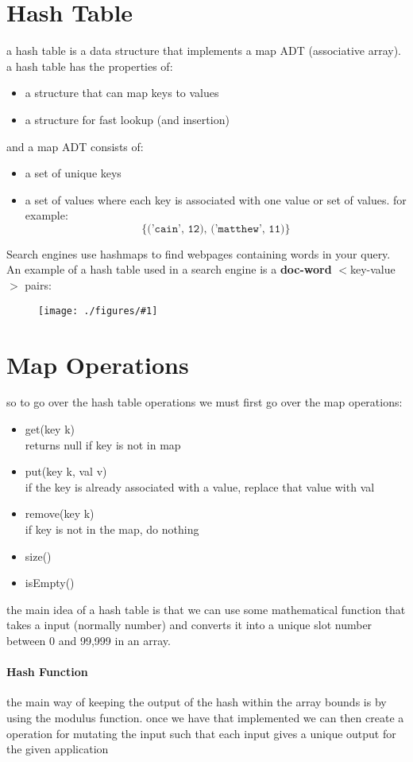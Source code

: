 \documentclass[12pt]{book}
\title{\coursetitle\linebreak\lecturename}
\author{\\Cain Susko\\ 
           \\ \\ \\
      Queen's University 
    \\School of Computing\\}
\newcommand{\incimg}[2]{%
       \begin{figure}[h]
               \centering
               \texttt{[image: ./figures/\#1]}
       \end{figure}
}
\begin{document}
\begin{titlepage}
        \maketitle
\end{titlepage}


\section*{Hash Table}
a hash table is a data structure that implements a map ADT (associative array). a hash table has the properties of:
\begin{itemize}
        \item a structure that can map keys to values
        \item a structure for fast lookup (and insertion)
\end{itemize}

and a map ADT consists of:
\begin{itemize}
        \item a set of unique keys
        \item a set of values where each key is associated with one value or set of values. for example:
                \[\texttt{\{('cain', 12), ('matthew', 11)\}}\]
\end{itemize}
Search engines use hashmaps to find webpages containing words in your query.
An example of a hash table used in a search engine is a \textbf{doc-word }$<$key-value$>$ pairs:
\incimg{keyval}{0.6}
\pagebreak

\section*{Map Operations}
so to go over the hash table operations we must first go over the map operations:
\begin{itemize}
        \item get(key k)\\
                returns null if key is not in map
        \item put(key k, val v)\\
                if the key is already associated with a value, replace that value with val
        \item remove(key k)\\
                if key is not in the map, do nothing
        \item size()
        \item isEmpty()
\end{itemize}

the main idea of a hash table is that we can use some mathematical function that takes a input (normally number) and converts it into a unique slot
number between 0 and 99,999 in an array.

\paragraph{Hash Function}
the main way of keeping the output of the hash within the array bounds is by using the modulus function. once we have that implemented we can
then create a operation for mutating the input such that each input gives a unique output for the given application
\end{document}
